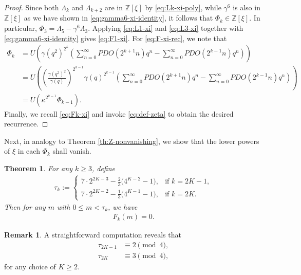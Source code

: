 \documentclass[12pt,reqno]{amsart}
\numberwithin{equation}{section}
\theoremstyle{theorem}
\newtheorem{theorem}{Theorem}
\theoremstyle{definition}
\newtheorem{remark}{Remark}
\begin{document}
\begin{proof}
	Since both $\Lambda_k$ and $\Lambda_{k+2}$ are in $\mathbb{Z}[\xi]$ by \eqref{eq:Lk-xi-poly}, while $\gamma^6$ is also in $\mathbb{Z}[\xi]$ as we have shown in \eqref{eq:gamma6-xi-identity}, it follows that $\Phi_k \in \mathbb{Z}[\xi]$. In particular, $\Phi_3 = \Lambda_5 - \gamma^6 \Lambda_3$. Applying \eqref{eq:L1-xi} and \eqref{eq:L3-xi} together with \eqref{eq:gamma6-xi-identity} gives \eqref{eq:F1-xi}. For \eqref{eq:F-xi-rec}, we note that
	\begin{align*}
		\Phi_k&=U\left(\gamma(q^2)^{2^{k}}\left(\sum_{n=0}^\infty PDO(2^{k+1}n)q^n - \sum_{n=0}^\infty PDO(2^{k-1}n)q^n\right)\right)\\
		&= U\left(\left(\frac{\gamma(q^2)^2}{\gamma(q)}\right)^{2^{k-1}} \gamma(q)^{2^{k-1}}\left(\sum_{n=0}^\infty PDO(2^{k+1}n)q^n - \sum_{n=0}^\infty PDO(2^{k-1}n)q^n\right)\right)\\
		&= U\left(\kappa^{2^{k-1}}\Phi_{k-1}\right).
	\end{align*}
	Finally, we recall \eqref{eq:Fk-xi} and invoke \eqref{eq:def-zeta} to obtain the desired recurrence.
\end{proof}


Next, in analogy to Theorem \ref{th:Z-nonvanishing}, we show that the lower powers of $\xi$ in each $\Phi_k$ shall vanish.

\begin{theorem}\label{th:F-nonvanishing}
	For any $k\ge 3$, define
	\begin{align*}
		\tau_{k}:=\begin{cases}
			7\cdot 2^{2K-3}-\tfrac{2}{3}\big(4^{K-2}-1\big), & \text{if $k=2K-1$},\\[6pt]
			7\cdot 2^{2K-2}-\tfrac{1}{3}\big(4^{K-1}-1\big), & \text{if $k=2K$}.
		\end{cases}
	\end{align*}
	Then for any $m$ with $0\le m< \tau_k$, we have
	\begin{align*}
		F_k(m) = 0.
	\end{align*}
\end{theorem}

\begin{remark}\label{rem:tau-mod-4}
	A straightforward computation reveals that 
	\begin{align}
		\tau_{2K-1} &\equiv 2 \pmod{4},\label{eq:tau-odd-mod-4}\\
		\tau_{2K} &\equiv 3 \pmod{4},\label{eq:tau-even-mod-4}
	\end{align}
	for any choice of $K\ge 2$.
\end{remark}
\end{document}
